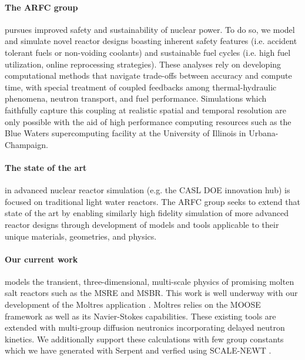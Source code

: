\documentclass[11pt]{article}
\newcommand{\authorname}{Kathryn~D.~Huff }
\newcommand{\authorsite}{arfc.npre.illinois.edu}
\begin{document}
\pagestyle{fancy}
\lhead{\textcolor{gray}{Investigator: Prof. \authorname}}
\rhead{\textcolor{gray}{Advanced Reactors and Fuel Cycles}}
\renewcommand{\headrulewidth}{0pt}
\renewcommand{\footrulewidth}{0pt}
\fancyfoot[C]{\footnotesize \textcolor{gray}{\authorsite}}

\paragraph{The \gls{ARFC} group} pursues improved 
safety and sustainability of nuclear power. To do so, we model and simulate novel reactor designs
boasting inherent safety features (i.e. accident tolerant fuels or non-voiding 
coolants) and sustainable fuel cycles (i.e. high fuel utilization, online 
reprocessing strategies). These analyses rely on developing computational 
methods that navigate trade-offs between accuracy and compute time, with 
special treatment of coupled feedbacks among thermal-hydraulic phenomena, 
neutron transport, and fuel performance.
Simulations which faithfully capture this coupling at realistic spatial and
temporal resolution are only possible with the aid of high performance
computing resources such as the Blue Waters supercomputing facility at the 
University of Illinois in Urbana-Champaign.

\paragraph{The state of the art} in advanced nuclear reactor simulation (e.g. the 
CASL DOE innovation hub) is focused on traditional light water reactors.  The 
\gls{ARFC} group seeks to extend that state of the art by enabling similarly high 
fidelity simulation of more advanced reactor designs through development of 
models and tools applicable to their unique materials, geometries, and physics. 

\paragraph{Our current work} models the transient, three-dimensional, multi-scale physics
of promising molten salt reactors such as the \gls{MSRE} and \gls{MSBR}.
This work is well underway with our development of the Moltres application 
\cite{lindsay_moltres_2017}. Moltres relies on the \gls{MOOSE} framework 
\cite{gaston_moose:_2009} as well as its Navier-Stokes capabilities. These 
existing tools are extended with multi-group diffusion neutronics incorporating 
delayed neutron kinetics. We additionally support these calculations with few group 
constants which we have generated with Serpent 
\cite{leppanen_serpent_2012,leppanen_study_2015} and verfied using 
SCALE-NEWT \cite{nuclear_regulatory_commission_scale:_1997}.
\end{document}
